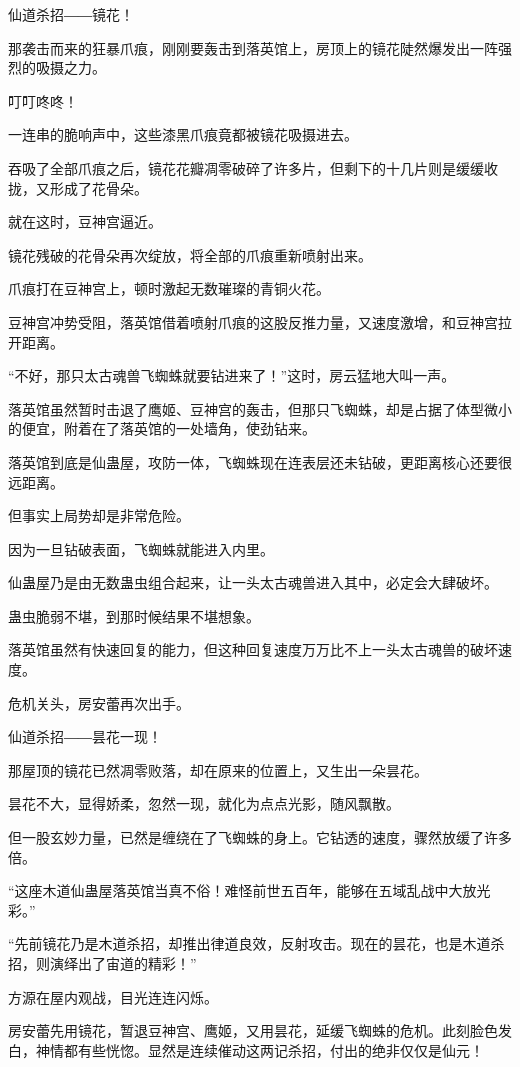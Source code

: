 \begin{this_body}
仙道杀招――镜花！

那袭击而来的狂暴爪痕，刚刚要轰击到落英馆上，房顶上的镜花陡然爆发出一阵强烈的吸摄之力。

叮叮咚咚！

一连串的脆响声中，这些漆黑爪痕竟都被镜花吸摄进去。

吞吸了全部爪痕之后，镜花花瓣凋零破碎了许多片，但剩下的十几片则是缓缓收拢，又形成了花骨朵。

就在这时，豆神宫逼近。

镜花残破的花骨朵再次绽放，将全部的爪痕重新喷射出来。

爪痕打在豆神宫上，顿时激起无数璀璨的青铜火花。

豆神宫冲势受阻，落英馆借着喷射爪痕的这股反推力量，又速度激增，和豆神宫拉开距离。

“不好，那只太古魂兽飞蜘蛛就要钻进来了！”这时，房云猛地大叫一声。

落英馆虽然暂时击退了鹰姬、豆神宫的轰击，但那只飞蜘蛛，却是占据了体型微小的便宜，附着在了落英馆的一处墙角，使劲钻来。

落英馆到底是仙蛊屋，攻防一体，飞蜘蛛现在连表层还未钻破，更距离核心还要很远距离。

但事实上局势却是非常危险。

因为一旦钻破表面，飞蜘蛛就能进入内里。

仙蛊屋乃是由无数蛊虫组合起来，让一头太古魂兽进入其中，必定会大肆破坏。

蛊虫脆弱不堪，到那时候结果不堪想象。

落英馆虽然有快速回复的能力，但这种回复速度万万比不上一头太古魂兽的破坏速度。

危机关头，房安蕾再次出手。

仙道杀招――昙花一现！

那屋顶的镜花已然凋零败落，却在原来的位置上，又生出一朵昙花。

昙花不大，显得娇柔，忽然一现，就化为点点光影，随风飘散。

但一股玄妙力量，已然是缠绕在了飞蜘蛛的身上。它钻透的速度，骤然放缓了许多倍。

“这座木道仙蛊屋落英馆当真不俗！难怪前世五百年，能够在五域乱战中大放光彩。”

“先前镜花乃是木道杀招，却推出律道良效，反射攻击。现在的昙花，也是木道杀招，则演绎出了宙道的精彩！”

方源在屋内观战，目光连连闪烁。

房安蕾先用镜花，暂退豆神宫、鹰姬，又用昙花，延缓飞蜘蛛的危机。此刻脸色发白，神情都有些恍惚。显然是连续催动这两记杀招，付出的绝非仅仅是仙元！


\end{this_body}
